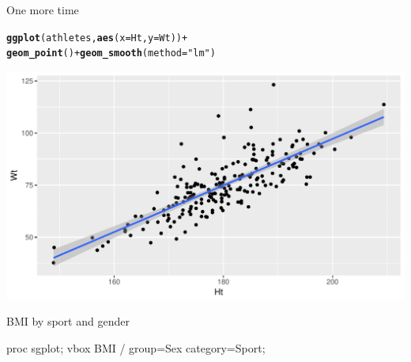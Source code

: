 \documentclass[unknownkeysallowed]{beamer}\usepackage[]{graphicx}\usepackage[]{color}
\makeatletter
\def\maxwidth{ %
  \ifdim\Gin@nat@width>\linewidth
    \linewidth
  \else
    \Gin@nat@width
  \fi
}
\newcommand{\hlstr}[1]{\textcolor[rgb]{0.192,0.494,0.8}{#1}}%
\newcommand{\hlopt}[1]{\textcolor[rgb]{0,0,0}{#1}}%
\newcommand{\hlstd}[1]{\textcolor[rgb]{0.345,0.345,0.345}{#1}}%
\newcommand{\hlkwc}[1]{\textcolor[rgb]{0.333,0.667,0.333}{#1}}%
\newcommand{\hlkwd}[1]{\textcolor[rgb]{0.737,0.353,0.396}{\textbf{#1}}}%
\newenvironment{kframe}{%
 \def\at@end@of@kframe{}%
 \ifinner\ifhmode%
  \def\at@end@of@kframe{\end{minipage}}%
  \begin{minipage}{\columnwidth}%
 \fi\fi%
 \def\FrameCommand##1{\hskip\@totalleftmargin \hskip-\fboxsep
 \colorbox{shadecolor}{##1}\hskip-\fboxsep
     \hskip-\linewidth \hskip-\@totalleftmargin \hskip\columnwidth}%
 \MakeFramed {\advance\hsize-\width
   \@totalleftmargin\z@ \linewidth\hsize
   \@setminipage}}%
 {\par\unskip\endMakeFramed%
 \at@end@of@kframe}
\newenvironment{knitrout}{}{} %
\makeatother
\begin{document}
\begin{frame}[fragile]{One more time}
  
\begin{knitrout}
\color{fgcolor}\begin{kframe}
\begin{alltt}
\hlkwd{ggplot}\hlstd{(athletes,}\hlkwd{aes}\hlstd{(}\hlkwc{x}\hlstd{=Ht,}\hlkwc{y}\hlstd{=Wt))}\hlopt{+}
  \hlkwd{geom_point}\hlstd{()}\hlopt{+}\hlkwd{geom_smooth}\hlstd{(}\hlkwc{method}\hlstd{=}\hlstr{"lm"}\hlstd{)}
\end{alltt}
\end{kframe}
\includegraphics[width=\maxwidth]{figure/unnamed-chunk-29-1} 

\end{knitrout}
  
\end{frame}

\begin{frame}[fragile]{BMI by sport and gender}
  
  \begin{Sascode}[store=gi]
proc sgplot;
  vbox BMI / group=Sex category=Sport;
  \end{Sascode}
  
\end{frame}
\end{document}
